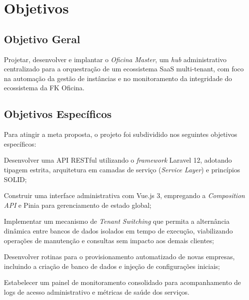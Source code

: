 \section{Objetivos}
\label{sec:objetivos}

\subsection{Objetivo Geral}
\label{subsec:objective-geral}

Projetar, desenvolver e implantar o \textit{Oficina Master}, um \textit{hub} administrativo centralizado para a orquestração de um ecossistema SaaS multi-tenant, com foco na automação da gestão de instâncias e no monitoramento da integridade do ecossistema da FK Oficina.

\subsection{Objetivos Específicos}
\label{subsec:objetivos-especificos}

Para atingir a meta proposta, o projeto foi subdividido nos seguintes objetivos específicos:

\begin{alineas}
    \item Desenvolver uma API RESTful utilizando o \textit{framework} Laravel 12, adotando tipagem estrita, arquitetura em camadas de serviço (\textit{Service Layer}) e princípios SOLID;
    \item Construir uma interface administrativa com Vue.js 3, empregando a \textit{Composition API} e Pinia para gerenciamento de estado global;
    \item Implementar um mecanismo de \textit{Tenant Switching} que permita a alternância dinâmica entre bancos de dados isolados em tempo de execução, viabilizando operações de manutenção e consultas sem impacto aos demais clientes;
    \item Desenvolver rotinas para o provisionamento automatizado de novas empresas, incluindo a criação de banco de dados e injeção de configurações iniciais;
    \item Estabelecer um painel de monitoramento consolidado para acompanhamento de logs de acesso administrativo e métricas de saúde dos serviços.
\end{alineas}

